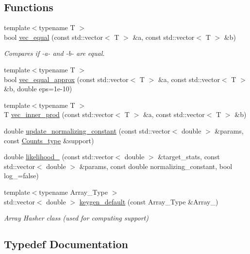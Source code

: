 \subsection*{Functions}
\begin{DoxyCompactItemize}
\item 
{\footnotesize template$<$typename T $>$ }\\bool \hyperlink{namespacebarry_afbdb85734a7793890ea4268ea114858e}{vec\+\_\+equal} (const std\+::vector$<$ T $>$ \&a, const std\+::vector$<$ T $>$ \&b)
\begin{DoxyCompactList}\small\item\em Compares if -\/a-\/ and -\/b-\/ are equal. \end{DoxyCompactList}\item 
{\footnotesize template$<$typename T $>$ }\\bool \hyperlink{namespacebarry_a24c4bd4a99dd82edf66c2d3b645dca08}{vec\+\_\+equal\+\_\+approx} (const std\+::vector$<$ T $>$ \&a, const std\+::vector$<$ T $>$ \&b, double eps=1e-\/10)
\item 
{\footnotesize template$<$typename T $>$ }\\T \hyperlink{namespacebarry_a0343fb4152724d5fa1ffa00d4b6182d9}{vec\+\_\+inner\+\_\+prod} (const std\+::vector$<$ T $>$ \&a, const std\+::vector$<$ T $>$ \&b)
\item 
double \hyperlink{namespacebarry_a822db820c95822d0e7a51728d9b9858d}{update\+\_\+normalizing\+\_\+constant} (const std\+::vector$<$ double $>$ \&params, const \hyperlink{namespacebarry_a3e2d8c3b6cf602107559d4237d9f1315}{Counts\+\_\+type} \&support)
\item 
double \hyperlink{namespacebarry_a1dcc0a46544cc9733ca8ee5619ef6d20}{likelihood\+\_\+} (const std\+::vector$<$ double $>$ \&target\+\_\+stats, const std\+::vector$<$ double $>$ \&params, const double normalizing\+\_\+constant, bool log\+\_\+=false)
\item 
{\footnotesize template$<$typename Array\+\_\+\+Type $>$ }\\std\+::vector$<$ double $>$ \hyperlink{namespacebarry_a22bfc7c4a1f5b5922edfd1101b8ffe3d}{keygen\+\_\+default} (const Array\+\_\+\+Type \&Array\+\_\+)
\begin{DoxyCompactList}\small\item\em Array Hasher class (used for computing support) \end{DoxyCompactList}\end{DoxyCompactItemize}


\subsection{Typedef Documentation}
\mbox{\label{namespacebarry_adc551002e63e38057d304f78d7756308}} 
